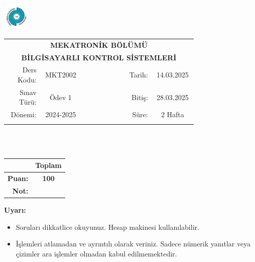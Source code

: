 \newcommand\UniversiteAdi{Niğde Ömer Halisdemir Üniversitesi}
\newcommand\BolumAdi{MEKATRONİK BÖLÜMÜ}
\newcommand\DersKodu{MKT2002}
\newcommand\DersAdi{BİLGİSAYARLI KONTROL SİSTEMLERİ}
\newcommand\SinavAdi{Ödev 1}
\newcommand\SinavTarihi{14.03.2025}
\newcommand\SinavSaati{28.03.2025}
\newcommand\SinavSuresi{2 Hafta}
\pagestyle{fancy}
\fancyhf{} %
\noindent \includegraphics[width=0.1\textwidth]{logo}
\begin{tabular}{
    p{0.15\linewidth}
    p{0.15\linewidth}
    p{0.2\linewidth}
    p{0.1\linewidth}
    p{0.15\linewidth}}
    \multicolumn{5}{c}{\textbf{\BolumAdi}}\\
    \multicolumn{5}{c}{\textbf{\DersAdi}}\\\hline
    \multicolumn{1}{|r|}{Ders Kodu:}&
    \multicolumn{1}{|c|}{\DersKodu}&
    \multicolumn{1}{|c|}{}& 
    \multicolumn{1}{|r|}{Tarih:}&
    \multicolumn{1}{|c|}{\SinavTarihi} \\\hline
    \multicolumn{1}{|r|}{Sınav Türü:}&
    \multicolumn{1}{|c|}{\SinavAdi}&  
    \multicolumn{1}{|c|}{}&
    \multicolumn{1}{|r|}{Bitiş:}&
    \multicolumn{1}{|c|}{\SinavSaati}\\\hline
    \multicolumn{1}{|r|}{Dönemi:}&
    \multicolumn{1}{|c|}{2024-2025}&
    \multicolumn{1}{|c|}{}&
    \multicolumn{1}{|r|}{Süre:}&
    \multicolumn{1}{|c|}{\SinavSuresi} \\\hline
    &&&&\\
\end{tabular}\\\\
\noindent\begin{center}
\begin{tabular}{|r|c|}\hline
    &\textbf{Toplam}\\\hline
    \textbf{Puan:} &\textbf{100}\\\hline
    \textbf{Not:}  &\\\hline
\end{tabular}\end{center}
\noindent\textbf{Uyarı:}
\begin{itemize}\bfseries
    \item Soruları dikkatlice okuyunuz. Hesap makinesi kullanılabilir.
    \item İşlemleri atlamadan ve ayrıntılı olarak veriniz. Sadece nümerik yanıtlar veya çizimler ara işlemler olmadan kabul edilmemektedir.
\end{itemize}
